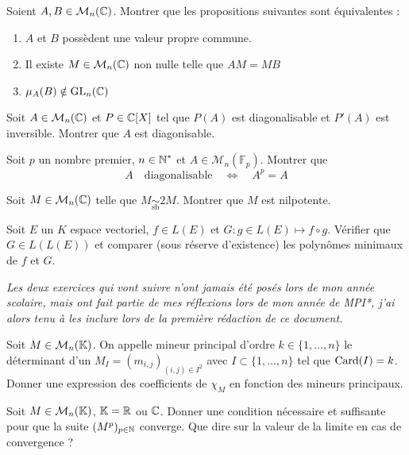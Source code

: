 \begin{exo}
	\label{reduction1}
	Soient $A,B\in\mathcal M_n(\operatorname{\mathbb C})$. Montrer que les propositions suivantes sont équivalentes :
	\begin{enumerate}
		\item $A$ et $B$ possèdent une valeur propre commune.
		\item Il existe $M\in\mathcal M_n(\operatorname{\mathbb C})$ non nulle telle que $AM=MB$
		\item $\mu_A(B)\notin \operatorname{GL}_n(\operatorname{\mathbb C})$
	\end{enumerate}
\end{exo}

\begin{exo}
	\label{reduction2}
    Soit $A\in\mathcal M_n(\operatorname{\mathbb C})$ et $P\in\operatorname{\mathbb C}[X]$ tel que $P(A)$ est diagonalisable et $P'(A)$ est inversible. Montrer que $A$ est diagonisable.
\end{exo}

\begin{exo}
	\label{reduction3}
    Soit $p$ un nombre premier, $n\in\operatorname{\mathbb N}^*$ et $A\in\mathcal M_n(\mathbb F_p)$. Montrer que \[A\quad \text{diagonalisable}\quad \iff\quad A^p=A\]
\end{exo}

\begin{exo}
	\label{reduction4}
	Soit $M\in\mathcal M_n(\operatorname{\mathbb C})$ telle que $M\underset{\text{sb}}{\sim}2M$. Montrer que $M$ est nilpotente.
\end{exo}

\begin{exo}
	\label{reduction5}
    Soit $E$ un $K$ espace vectoriel, $f\in L(E)$ et $G:g\in L(E)\mapsto f\circ g$. Vérifier que $G\in L(L(E))$ et comparer (sous réserve d'existence) les polynômes minimaux de $f$ et $G$.
\end{exo}

\textit{Les deux exercices qui vont suivre n'ont jamais été posés lors de mon année scolaire, mais ont fait partie de mes réflexions lors de mon année de MPI*, j'ai alors tenu à les inclure lors de la première rédaction de ce document.}

\begin{exo}
	\label{reduction6}
	Soit $M\in\mathcal M_n(\operatorname{\mathbb K})$. On appelle mineur principal d'ordre $k\in\lbrace1,\dots,n\rbrace$ le déterminant d'un $M_I=(m_{i,j})_{(i,j)\in I^2}$ avec $I\subset\lbrace 1,\dots,n\rbrace$ tel que $\operatorname{Card}(I)=k$. Donner une expression des coefficients de $\chi_M$ en fonction des mineurs principaux.
\end{exo}

\begin{exo}
	\label{reduction7}
	Soit $M\in\mathcal M_n(\operatorname{\mathbb K})$, $\operatorname{\mathbb K} = \operatorname{\mathbb R}$ ou $\operatorname{\mathbb C}$. Donner une condition nécessaire et suffisante pour que la suite $(M^p)_{p\in\operatorname{\mathbb N}}$ converge. Que dire sur la valeur de la limite en cas de convergence ?
\end{exo}